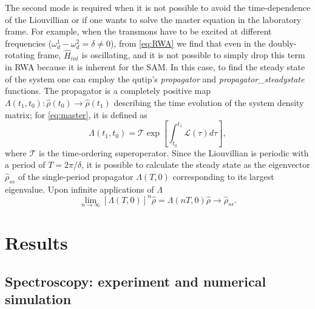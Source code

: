 \documentclass[%
 prx,
 amsmath,amssymb,
 reprint,%
]{revtex4-1}
\begin{document}
The second mode is required when it is not possible to avoid the time-dependence of the Liouvillian or if one wants to solve the master equation in the laboratory frame. For example, when the transmons have to be excited at different frequencies ($\omega_d^1 - \omega_d^2 = \delta \neq 0$), from \autoref{eq:RWA} we find that even in the doubly-rotating frame, $\hat H_{int}$ is oscillating, and it is not possible to simply drop this term in RWA because it is inherent for the SAM. In this case, to find the steady state of the system one can employ the qutip's \textit{propagator} and \textit{propagator\_steadystate} functions. The propagator is a completely positive map $\Lambda(t_1, t_0): \hat \rho(t_0) \rightarrow \hat \rho(t_1)$ describing the time evolution of the system density matrix; for \autoref{eq:master}, it is defined as
\begin{equation}
\Lambda(t_1, t_0) = \mathcal{T} \exp [\int_{t_0}^{t_1} \mathcal L(\tau) d\tau],
\label{eq:propagator}
\end{equation}
where $\mathcal T$ is the time-ordering superoperator. Since the Liouvillian is periodic with a period of $T = 2\pi/\delta$, it is possible to calculate the steady state as the eigenvector $\hat \rho_{ss}$ of the single-period propagator $\Lambda(T, 0)$ corresponding to its largest eigenvalue\cite{dittrich1998quantum, rivas2012open}. Upon infinite applications of $\Lambda$
\[
\lim_{n\to \infty} \left[\Lambda(T, 0)\right]^n \hat \rho = \Lambda(nT, 0) \hat \rho \to \hat \rho_{ss}.
\]


\section{Results}

\subsection{\label{sec:level1} Spectroscopy: experiment and numerical simulation}
\end{document}
